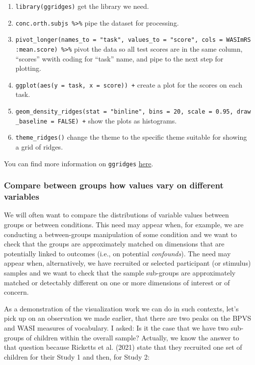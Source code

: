 \documentclass[
  letterpaper,
  DIV=11,
  numbers=noendperiod]{scrreprt}
\providecommand{\tightlist}{%
  \setlength{\itemsep}{0pt}\setlength{\parskip}{0pt}}\usepackage{longtable,booktabs,array}
\begin{document}
\begin{enumerate}
\def\labelenumi{\arabic{enumi}.}
\tightlist
\item
  \texttt{library(ggridges)} get the library we need.
\item
  \texttt{conc.orth.subjs\ \%\textgreater{}\%} pipe the dataset for
  processing.
\item
  \texttt{pivot\_longer(names\_to\ =\ "task",\ values\_to\ =\ "score",\ cols\ =\ WASImRS:mean.score)\ \%\textgreater{}\%}
  pivot the data so all test scores are in the same column, ``scores''
  wwith coding for ``task'' name, and pipe to the next step for
  plotting.
\item
  \texttt{ggplot(aes(y\ =\ task,\ x\ =\ score))\ +} create a plot for
  the scores on each task.
\item
  \texttt{geom\_density\_ridges(stat\ =\ "binline",\ bins\ =\ 20,\ scale\ =\ 0.95,\ draw\_baseline\ =\ FALSE)\ +}
  show the plots as histograms.
\item
  \texttt{theme\_ridges()} change the theme to the specific theme
  suitable for showing a grid of ridges.
\end{enumerate}

You can find more information on \texttt{ggridges}
\href{https://cran.r-project.org/web/packages/ggridges/vignettes/introduction.html}{here}.

\hypertarget{sec-compare-distributions-groups}{%
\subsubsection{Compare between groups how values vary on different
variables}\label{sec-compare-distributions-groups}}

We will often want to compare the distributions of variable values
between groups or between conditions. This need may appear when, for
example, we are conducting a between-groups manipulation of some
condition and we want to check that the groups are approximately matched
on dimensions that are potentially linked to outcomes (i.e., on
potential \emph{confounds}). The need may appear when, alternatively, we
have recruited or selected participant (or stimulus) samples and we want
to check that the sample sub-groups are approximately matched or
detectably different on one or more dimensions of interest or of
concern.

As a demonstration of the visualization work we can do in such contexts,
let's pick up on an observation we made earlier, that there are two
peaks on the BPVS and WASI measures of vocabulary. I asked: Is it the
case that we have two sub-groups of children within the overall sample?
Actually, we know the answer to that question because Ricketts et al.
(2021) state that they recruited one set of children for their Study 1
and then, for Study 2:
\end{document}
